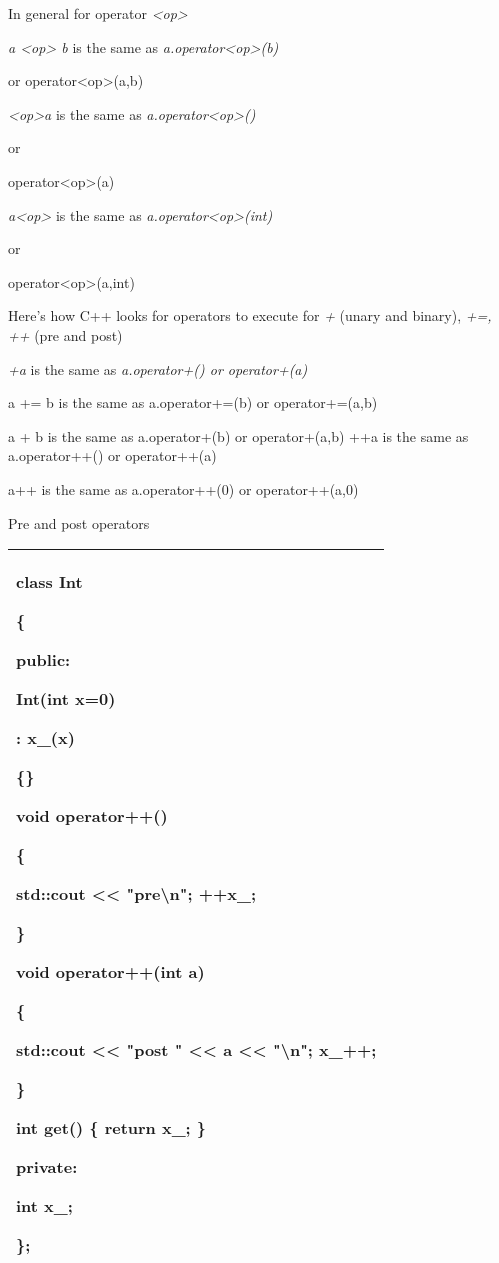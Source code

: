 \documentclass[
]{article}
\begin{document}
In general for operator \emph{\textless op\textgreater{}}

\emph{ a \textless op\textgreater{} b }is the same as\emph{
a.operator\textless op\textgreater(b) }

or operator\textless op\textgreater(a,b)

\emph{ \textless op\textgreater a }is the same as\emph{
a.operator\textless op\textgreater() }

or

operator\textless op\textgreater(a)

\emph{ a\textless op\textgreater{} }is the same as\emph{
a.operator\textless op\textgreater(int) }

or

operator\textless op\textgreater(a,int)

Here's how C++ looks for operators to execute for \emph{+} (unary and
binary), \emph{+=, ++} (pre and post)

\emph{+a }is the same as\emph{ a.operator+() or operator+(a)}

a += b is the same as a.operator+=(b) or operator+=(a,b)

a + b is the same as a.operator+(b) or operator+(a,b) ++a is the same as
a.operator++() or operator++(a)

a++ is the same as a.operator++(0) or operator++(a,0)

Pre and post operators

\begin{longtable}[]{@{}l@{}}
\toprule
\endhead
\begin{minipage}[t]{0.97\columnwidth}\raggedright
class Int

\{

public:

Int(int x=0)

: x\_(x)

\{\}

void operator++()

\{

std::cout \textless\textless{} "pre\textbackslash n"; ++x\_;

\}

void operator++(int a)

\{

std::cout \textless\textless{} "post " \textless\textless{} a
\textless\textless{} "\textbackslash n"; x\_++;

\}

int get() \{ return x\_; \}

private:

int x\_;

\};\strut
\end{minipage}\tabularnewline
\bottomrule
\end{longtable}
\end{document}

